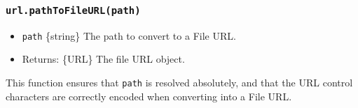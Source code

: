 \subsubsection{\texorpdfstring{\texttt{url.pathToFileURL(path)}}{url.pathToFileURL(path)}}\label{url.pathtofileurlpath}

\begin{itemize}
\tightlist
\item
  \texttt{path} \{string\} The path to convert to a File URL.
\item
  Returns: \{URL\} The file URL object.
\end{itemize}

This function ensures that \texttt{path} is resolved absolutely, and
that the URL control characters are correctly encoded when converting
into a File URL.

\begin{Shaded}
\begin{Highlighting}[]
 \OperatorTok{;}

 \NormalTok{(}\OperatorTok{,} \NormalTok{)}\OperatorTok{;}           
\NormalTok{(}\NormalTok{)}\OperatorTok{;}              

 \NormalTok{(}\OperatorTok{,} \NormalTok{)}\OperatorTok{;}    
\NormalTok{(}\NormalTok{)}\OperatorTok{;}       
\end{Highlighting}
\end{Shaded}

